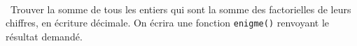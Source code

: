 \exer{[NBR-000]}
\setcounter{numques}{0}~\\

\question\ Trouver la somme de tous les entiers qui sont la somme des factorielles de leurs chiffres, en écriture décimale. On écrira une fonction \texttt{enigme()} renvoyant le résultat demandé.
